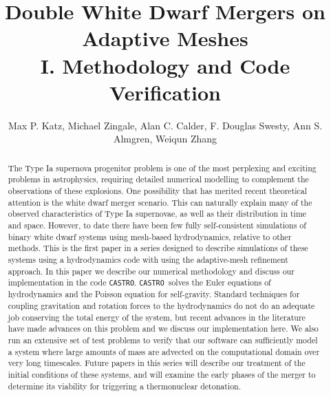 \documentclass[iop]{../emulateapj}
\newcommand{\castro}{\texttt{CASTRO}}
\begin{document}
\title{Double White Dwarf Mergers on Adaptive Meshes\\ I. Methodology and Code Verification}


\author{Max P. Katz, Michael Zingale, Alan C. Calder, F. Douglas Swesty, Ann S. Almgren, Weiqun Zhang}
\begin{abstract}
The Type Ia supernova progenitor problem is one of the most perplexing and 
exciting problems in astrophysics, requiring detailed numerical modelling to 
complement the observations of these explosions. One possibility that has 
merited recent theoretical attention is the white dwarf merger scenario.
This can naturally explain many of the observed characteristics of 
Type Ia supernovae, as well as their distribution in time and space.
However, to date there have been few fully self-consistent simulations 
of binary white dwarf systems using mesh-based hydrodynamics, 
relative to other methods. This is the first paper in a series designed to 
describe simulations of these systems using a hydrodynamics code with 
using the adaptive-mesh refinement approach. In this paper we describe our numerical 
methodology and discuss our implementation in the code \castro. \castro\ 
solves the Euler equations of hydrodynamics 
and the Poisson equation for self-gravity. Standard techniques for 
coupling gravitation and rotation forces to the hydrodynamics do 
not do an adequate job conserving the total energy of the system, 
but recent advances in the literature have made advances on this 
problem and we discuss our implementation here. We also run an 
extensive set of test problems to verify that our software can sufficiently
model a system where large amounts of mass are advected on the computational 
domain over very long timescales. Future papers in this series will describe
our treatment of the initial conditions of these systems, and will 
examine the early phases of the merger to determine its viability
for triggering a thermonuclear detonation.

\end{abstract}
\end{document}
